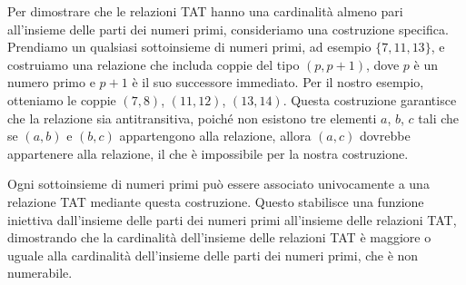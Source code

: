 \documentclass{article}
\begin{document}
Per dimostrare che le relazioni TAT hanno una cardinalità almeno pari all'insieme delle parti dei numeri primi, consideriamo una costruzione specifica. Prendiamo un qualsiasi sottoinsieme di numeri primi, ad esempio \(\{7, 11, 13\}\), e costruiamo una relazione che includa coppie del tipo \((p, p+1)\), dove \(p\) è un numero primo e \(p+1\) è il suo successore immediato. Per il nostro esempio, otteniamo le coppie \((7, 8)\), \((11, 12)\), \((13, 14)\). Questa costruzione garantisce che la relazione sia antitransitiva, poiché non esistono tre elementi \(a\), \(b\), \(c\) tali che se \((a, b)\) e \((b, c)\) appartengono alla relazione, allora \((a, c)\) dovrebbe appartenere alla relazione, il che è impossibile per la nostra costruzione.

Ogni sottoinsieme di numeri primi può essere associato univocamente a una relazione TAT mediante questa costruzione. Questo stabilisce una funzione iniettiva dall'insieme delle parti dei numeri primi all'insieme delle relazioni TAT, dimostrando che la cardinalità dell'insieme delle relazioni TAT è maggiore o uguale alla cardinalità dell'insieme delle parti dei numeri primi, che è non numerabile.
\end{document}
